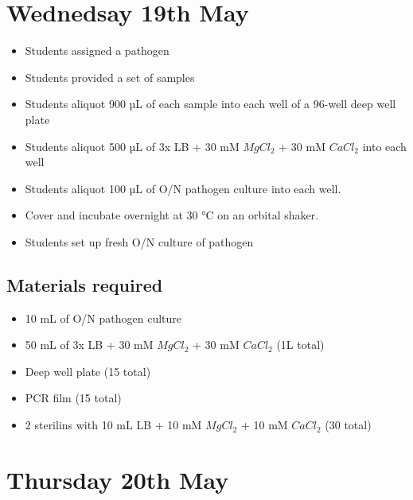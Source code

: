\documentclass[
]{book}
\providecommand{\tightlist}{%
  \setlength{\itemsep}{0pt}\setlength{\parskip}{0pt}}
\begin{document}
\hypertarget{wednedsay-19th-may}{%
\section{Wednedsay 19th May}\label{wednedsay-19th-may}}

\begin{itemize}
\tightlist
\item
  Students assigned a pathogen
\item
  Students provided a set of samples
\item
  Students aliquot 900 µL of each sample into each well of a 96-well deep well plate
\item
  Students aliquot 500 µL of 3x LB + 30 mM \(MgCl_{2}\) + 30 mM \(CaCl_{2}\) into each well
\item
  Students aliquot 100 µL of O/N pathogen culture into each well.
\item
  Cover and incubate overnight at 30 °C on an orbital shaker.
\item
  Students set up fresh O/N culture of pathogen
\end{itemize}

\hypertarget{materials-required-2}{%
\subsection{Materials required}\label{materials-required-2}}

\begin{itemize}
\tightlist
\item
  10 mL of O/N pathogen culture
\item
  50 mL of 3x LB + 30 mM \(MgCl_{2}\) + 30 mM \(CaCl_{2}\) (1L total)
\item
  Deep well plate (15 total)
\item
  PCR film (15 total)
\item
  2 sterilins with 10 mL LB + 10 mM \(MgCl_{2}\) + 10 mM \(CaCl_{2}\) (30 total)
\end{itemize}

\hypertarget{thursday-20th-may}{%
\section{Thursday 20th May}\label{thursday-20th-may}}
\end{document}
